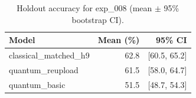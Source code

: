 \begin{table}[ht]
\centering
\caption{Holdout accuracy for exp_008 (mean $\pm$ 95\% bootstrap CI).}
\label{tab:exp_008}
\begin{tabular}{lrr}
\toprule
Model & Mean (\%) & 95\% CI \\
\midrule
classical\_matched\_h9 & 62.8 & [60.5, 65.2] \\
quantum\_reupload & 61.5 & [58.0, 64.7] \\
quantum\_basic & 51.5 & [48.7, 54.3] \\
\bottomrule
\end{tabular}
\end{table}
